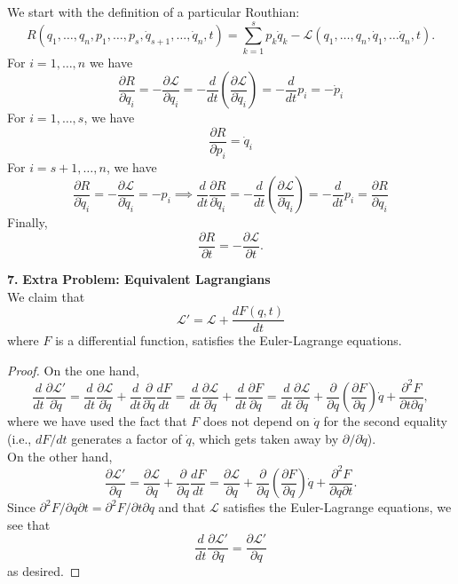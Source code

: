 \documentclass{article}
\theoremstyle{definition}
\newcommand{\p}{\partial}
\newcommand{\lag}{\mathcal{L}}
\newcommand{\f}[2]{\frac{#1}{#2}}
\newcommand{\lp}{\left(}
\newcommand{\rp}{\right)}
\begin{document}
\noindent We start with the definition of a particular Routhian:
\begin{equation*}
R(q_1,\dots,q_n, p_1,\dots,p_s, \dot{q}_{s+1}, \dots, \dot{q}_{n},t) = \sum^s_{k=1} p_k \dot{q}_k  - \lag(q_1,\dots,q_n, \dot{q}_1,\dots \dot{q}_n,t).
\end{equation*}
For $i = 1,\dots,n$ we have
\begin{equation*}
\boxed{\f{\p R}{\p q_i}} = -\f{\p \lag}{\p q_i} = -\f{d}{dt} \lp \f{\p \lag}{\p \dot{q}_i} \rp = -\f{d}{dt}p_i = \boxed{-\dot{p}_i}
\end{equation*}
For $i=1,\dots,s$, we have
\begin{equation*}
\boxed{\f{\p R}{\p p_i} = \dot{q}_i}
\end{equation*}
For $i = s+1,\dots,n$, we have 
\begin{equation*}
\boxed{\f{\p R}{\p \dot{q}_i}} = -\f{\p \lag}{\p \dot{q}_i} = \boxed{-p_i} \implies \boxed{\f{d}{dt}\f{\p R}{\p \dot{q}_i}} = -\f{d}{dt}\lp \f{\p \lag}{\p \dot{q}_i} \rp = -\f{d}{dt} p_i = \boxed{\f{\p R}{\p q_i}}
\end{equation*}
Finally, 
\begin{equation*}
\f{\p R}{\p t} = -\f{\p \lag}{\p t}.
\end{equation*}

\newpage
\noindent \textbf{7.} \textbf{Extra Problem: Equivalent Lagrangians}\\


\noindent We claim that 
\begin{equation*}
\lag' = \lag + \f{dF(q,t)}{dt}
\end{equation*}
where $F$ is a differential function, satisfies the Euler-Lagrange equations.


\begin{proof}
	On the one hand, 
	\begin{equation*}
	\f{d}{dt} \f{\p \lag'}{\p \dot{q}}  =
	\f{d}{dt} \f{\p \lag}{\p \dot{q}}  + \f{d}{dt} \f{\p }{\p \dot{q}} \f{d F}{d t} =  \f{d}{dt} \f{\p \lag}{\p \dot{q}}  
	+ \f{d}{dt}\f{\p F}{\p q} 
	= \f{d}{dt} \f{\p \lag}{\p \dot{q}} 
	+ \f{\p}{\p q}\lp \f{\p F}{\p q} \rp \dot{q}
	+ \f{\p^2 F}{\p t \p q},
	\end{equation*}
	where we have used the fact that $F$ does not depend on $\dot{q}$ for the second equality (i.e., $d F/d t$ generates a factor of $\dot{q}$, which gets taken away by $\p/\p \dot{q}$). \\
	
	On the other hand,
	\begin{equation*}
	\f{\p \lag'}{\p q}  = \f{\p \lag }{\p q} +  \f{\p}{\p q} \f{dF}{dt} = \f{\p \lag }{\p q} +  \f{\p}{\p q} \lp \f{\p F}{\p q}\rp\dot{q} + \f{\p^2 F}{\p q\p t}.
	\end{equation*}
	Since $\p^2 F/\p q\p t = \p^2 F/\p t \p q$ and that $\lag$ satisfies the Euler-Lagrange equations, we see that 
	\begin{equation*}
	\f{d}{dt}\f{\p \lag'}{\p \dot{q}} = \f{\p \lag'}{\p q}
	\end{equation*}
	as desired.
\end{proof} 

	
	
	
	
	
	
	
	
	
	
	
	
	
	
	
\end{document}
